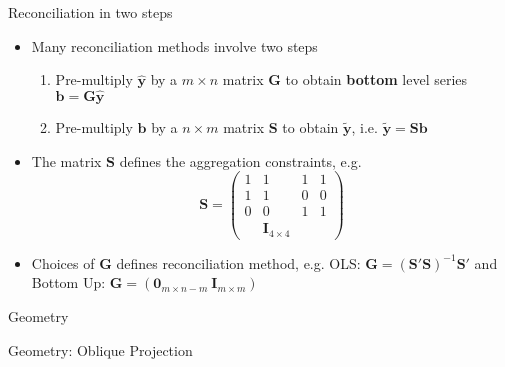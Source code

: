\documentclass{beamer}
\begin{document}
  \begin{frame}{Reconciliation in two steps}
  	\begin{itemize}
  		\item Many reconciliation methods involve two steps
  		\begin{enumerate}
  			\item Pre-multiply $\hat{\bm y}$ by a $m\times n$ matrix $\bm G$ to obtain {\bf bottom} level series ${\bm b}={\bm G}{\hat{\bm y}}$ 
  			\item Pre-multiply ${\bm b}$ by a $n\times m$ matrix $\bm S$ to obtain ${\tilde{\bm y}}$, i.e. $\tilde{\bm y}={\bm S}{{\bm b}}$
  		\end{enumerate}
  	    \item The matrix ${\bm S}$ defines the aggregation constraints, e.g.
  	    \begin{equation*}
  	    {\bm S}=\begin{pmatrix} 1 &1 &1 &1 \\1 &1 &0 &0 \\0 &0 &1 &1 \\ &{\bm I_{4\times 4}}
  	    \end{pmatrix}
  	    \end{equation*}
  	    \item Choices of ${\bm G}$ defines reconciliation method, e.g. OLS: ${\bm G}=\left(\bm{S}'\bm{S}\right)^{-1}{\bm S'}$ and Bottom Up: ${\bm G}=\left(\bm{0}_{m\times n-m}~\bm{I}_{m\times m}\right)$ 
    \end{itemize}
  \end{frame}
  \begin{frame}{Geometry}
  	\vspace{-2.3cm}
  	\centering
  	
  \end{frame}
  \begin{frame}{Geometry: Oblique Projection}
  	\vspace{-0.9cm}
  	\centering
  	
  \end{frame}
\end{document}
